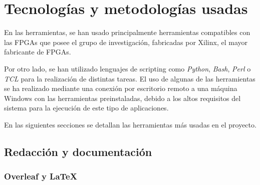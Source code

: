 \chapter{Tecnologías y metodologías usadas}

En las herramientas, se han usado principalmente herramientas compatibles con las FPGAs que posee el grupo de investigación, fabricadas por Xilinx, el mayor fabricante de FPGAs.

Por otro lado, se han utilizado lenguajes de scripting como \textit{Python}, \textit{Bash}, \textit{Perl} o \textit{TCL} para la realización de distintas tareas. El uso de algunas de las herramientas se ha realizado mediante una conexión por escritorio remoto a una máquina Windows con las herramientas preinstaladas, debido a los altos requisitos del sistema para la ejecución de este tipo de aplicaciones.

En las siguientes secciones se detallan las herramientas más usadas en el proyecto.

\section{Redacción y documentación}

\subsection{Overleaf y \LaTeX}

